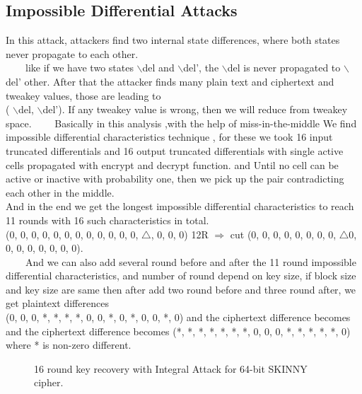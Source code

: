\documentclass[preprint]{transcrypto}
\begin{document}
{\subsection{Impossible Differential Attacks}
\tab In this attack, attackers find two internal state differences, where both states never propagate to
each other.\\
\tab$\quad\quad$like if we have two states $\backslash$del and $\backslash$del', the $\backslash$del is never propagated to $\backslash$del' other.
After that the attacker finds many plain text and ciphertext and tweakey values, those are
leading to \\( $\backslash$del, $\backslash$del'). If any tweakey value is wrong, then we will reduce from tweakey space.
\tab$\quad\quad$Basically in this analysis ,with the help of miss-in-the-middle We find impossible differential
characteristics technique , for these we took 16 input truncated differentials and 16 output
truncated differentials with single active cells propagated with encrypt and decrypt function.
and Until no cell can be active or inactive with probability one, then we pick up the pair
contradicting each other in the middle.\\
And in the end we get the longest impossible differential characteristics to reach 11 rounds with
16 such characteristics in total.\\
(0, 0, 0, 0, 0, 0, 0, 0, 0, 0, 0, 0, $\triangle$, 0, 0, 0) 12R $\Rightarrow$ cut (0, 0, 0, 0, 0, 0, 0, 0, $\triangle$0, 0, 0, 0, 0, 0, 0, 0).\\
\tab$\quad\quad$And we can also add several round before and after the 11 round impossible differential
characteristics, and number of round depend on key size, if block size and key size are same
then after add two round before and three round after, we get plaintext differences
\\(0, 0, 0, *, *, *, *, 0, 0, *, 0, *, 0, 0, *, 0) and the ciphertext difference becomes and the
ciphertext difference becomes (*, *, *, *, *, *, *, 0, 0, 0, *, *, *, *, *, 0) where * is non-zero
different.\\
\begin{figure}[H]
	\centering
	\caption{16 round key recovery with Integral Attack for 64-bit SKINNY cipher.}

\end{figure}}
\end{document}
